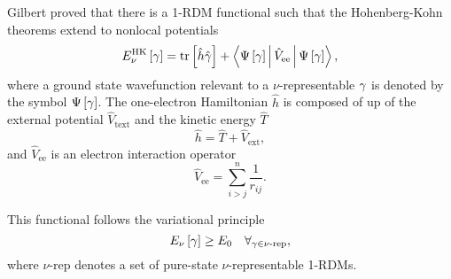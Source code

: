 Gilbert proved that there is a 1-RDM functional
such that the Hohenberg-Kohn theorems extend to 
nonlocal potentials
\begin{equation} \label{ec:HK-functional}
    \func{E_{\nu}^{\text{HK}}}{\fordm} = 
    \mytrace{\hat{h} \hat{\fordm}} + 
    \Braket{\func{\Psi}{\fordm} | \hat{V}_{\text{ee}} | \func{\Psi}{\fordm}}
    ,
\end{equation}
where a ground state wavefunction relevant to a $\nu$-representable $\gamma$ 
is denoted by the symbol $\Psi \left[ \gamma \right]$.
The one-electron Hamiltonian $\hat{h}$ is composed of up of the external
potential $\hat{V}_{\text{text}}$ and the kinetic energy $\hat{T}$
\begin{equation}
    \hat{h} = \hat{T} + \hat{V}_{\text{ext}}
        ,
\end{equation}
and $\hat{V}_{\text{ee}}$ is an electron interaction operator 
\begin{equation}
    \hat{V}_{\text{ee}} = 
    \sum_{i>j}^{n} \frac{1}{r_{ij}}
    .
\end{equation}

This functional follows the variational principle 
\begin{equation} \label{ec:var-princ-nu-rep}
    E_{\nu} \left[ \gamma \right] \ge E_0 \quad \forall_{\gamma \in \text{$\nu$-rep}}
    ,
\end{equation}
where $\nu$-rep denotes a set of pure-state $\nu$-representable 1-RDMs.

